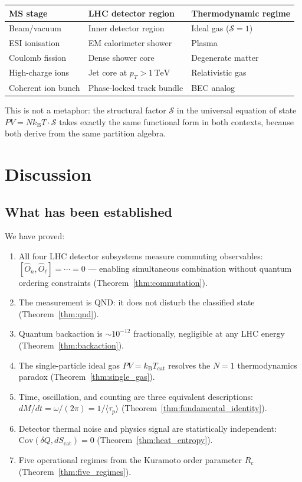 \documentclass[twocolumn,10pt,a4paper]{article}
\theoremstyle{thmstyle}
\theoremstyle{definition}
\theoremstyle{remark}
\newcommand{\kB}{k_{\mathrm{B}}}
\begin{document}
\begin{center}\small
\begin{tabular}{lll}
\toprule
MS stage & LHC detector region & Thermodynamic regime \\
\midrule
Beam/vacuum & Inner detector region & Ideal gas ($\mathcal{S} = 1$) \\
ESI ionisation & EM calorimeter shower & Plasma \\
Coulomb fission & Dense shower core & Degenerate matter \\
High-charge ions & Jet core at $p_T > 1\,\mathrm{TeV}$ & Relativistic gas \\
Coherent ion bunch & Phase-locked track bundle & BEC analog \\
\bottomrule
\end{tabular}
\end{center}

This is not a metaphor: the structural factor $\mathcal{S}$ in the universal
equation of state $PV = N\kB T \cdot \mathcal{S}$ takes exactly the same
functional form in both contexts, because both derive from the same
partition algebra.

\section{Discussion}
\label{sec:discussion}

\subsection{What has been established}

We have proved:
\begin{enumerate}[nosep,label=(\arabic*)]
\item All four LHC detector subsystems measure commuting observables:
$[\hat{O}_n, \hat{O}_\ell] = \cdots = 0$ — enabling simultaneous combination
without quantum ordering constraints (Theorem~\ref{thm:commutation}).
\item The measurement is QND: it does not disturb the classified state
(Theorem~\ref{thm:qnd}).
\item Quantum backaction is $\sim 10^{-12}$ fractionally, negligible at
any LHC energy (Theorem~\ref{thm:backaction}).
\item The single-particle ideal gas $PV = \kB T_{\mathrm{cat}}$ resolves
the $N = 1$ thermodynamics paradox (Theorem~\ref{thm:single_gas}).
\item Time, oscillation, and counting are three equivalent descriptions:
$dM/dt = \omega/(2\pi) = 1/\langle\tau_p\rangle$
(Theorem~\ref{thm:fundamental_identity}).
\item Detector thermal noise and physics signal are statistically independent:
$\mathrm{Cov}(\delta Q, dS_{\mathrm{cat}}) = 0$
(Theorem~\ref{thm:heat_entropy}).
\item Five operational regimes from the Kuramoto order parameter $R_c$
(Theorem~\ref{thm:five_regimes}).
\end{enumerate}
\end{document}
